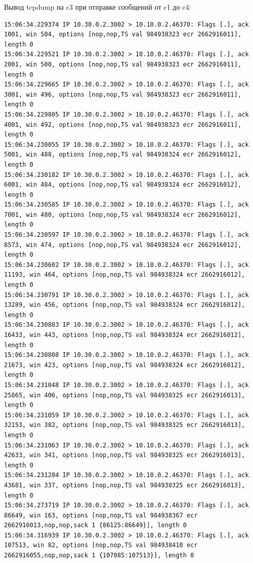 \documentclass[a4paper,12pt]{article}
\begin{document}
Вывод tcpdump на c3 при отправке сообщений от c1 до c4:
\begin{Verbatim}
15:06:34.229374 IP 10.30.0.2.3002 > 10.10.0.2.46370: Flags [.], ack 1001, win 504, options [nop,nop,TS val 984938323 ecr 2662916011], length 0
15:06:34.229521 IP 10.30.0.2.3002 > 10.10.0.2.46370: Flags [.], ack 2001, win 500, options [nop,nop,TS val 984938323 ecr 2662916011], length 0
15:06:34.229665 IP 10.30.0.2.3002 > 10.10.0.2.46370: Flags [.], ack 3001, win 496, options [nop,nop,TS val 984938323 ecr 2662916011], length 0
15:06:34.229805 IP 10.30.0.2.3002 > 10.10.0.2.46370: Flags [.], ack 4001, win 492, options [nop,nop,TS val 984938323 ecr 2662916011], length 0
15:06:34.230055 IP 10.30.0.2.3002 > 10.10.0.2.46370: Flags [.], ack 5001, win 488, options [nop,nop,TS val 984938324 ecr 2662916012], length 0
15:06:34.230182 IP 10.30.0.2.3002 > 10.10.0.2.46370: Flags [.], ack 6001, win 484, options [nop,nop,TS val 984938324 ecr 2662916012], length 0
15:06:34.230585 IP 10.30.0.2.3002 > 10.10.0.2.46370: Flags [.], ack 7001, win 480, options [nop,nop,TS val 984938324 ecr 2662916012], length 0
15:06:34.230597 IP 10.30.0.2.3002 > 10.10.0.2.46370: Flags [.], ack 8573, win 474, options [nop,nop,TS val 984938324 ecr 2662916012], length 0
15:06:34.230602 IP 10.30.0.2.3002 > 10.10.0.2.46370: Flags [.], ack 11193, win 464, options [nop,nop,TS val 984938324 ecr 2662916012], length 0
15:06:34.230791 IP 10.30.0.2.3002 > 10.10.0.2.46370: Flags [.], ack 13289, win 456, options [nop,nop,TS val 984938324 ecr 2662916012], length 0
15:06:34.230803 IP 10.30.0.2.3002 > 10.10.0.2.46370: Flags [.], ack 16433, win 443, options [nop,nop,TS val 984938324 ecr 2662916012], length 0
15:06:34.230808 IP 10.30.0.2.3002 > 10.10.0.2.46370: Flags [.], ack 21673, win 423, options [nop,nop,TS val 984938324 ecr 2662916012], length 0
15:06:34.231048 IP 10.30.0.2.3002 > 10.10.0.2.46370: Flags [.], ack 25865, win 406, options [nop,nop,TS val 984938325 ecr 2662916013], length 0
15:06:34.231059 IP 10.30.0.2.3002 > 10.10.0.2.46370: Flags [.], ack 32153, win 382, options [nop,nop,TS val 984938325 ecr 2662916013], length 0
15:06:34.231063 IP 10.30.0.2.3002 > 10.10.0.2.46370: Flags [.], ack 42633, win 341, options [nop,nop,TS val 984938325 ecr 2662916013], length 0
15:06:34.231284 IP 10.30.0.2.3002 > 10.10.0.2.46370: Flags [.], ack 43681, win 337, options [nop,nop,TS val 984938325 ecr 2662916013], length 0
15:06:34.273719 IP 10.30.0.2.3002 > 10.10.0.2.46370: Flags [.], ack 86649, win 163, options [nop,nop,TS val 984938367 ecr 2662916013,nop,nop,sack 1 {86125:86649}], length 0
15:06:34.316939 IP 10.30.0.2.3002 > 10.10.0.2.46370: Flags [.], ack 107513, win 82, options [nop,nop,TS val 984938410 ecr 2662916055,nop,nop,sack 1 {107085:107513}], length 0

\end{Verbatim}
\end{document}
